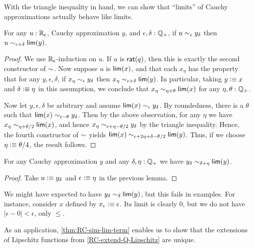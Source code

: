 With the triangle inequality in hand, we can show that ``limits'' of Cauchy approximations actually behave like limits.

\begin{lem}\label{thm:RC-sim-lim}
  For any $u:\mathbb{R}_\mathsf{c}$, Cauchy approximation $y$, and $\epsilon,\delta:\mathbb{Q}_{+}$, if $u\sim_{\epsilon} y_\delta$ then $u\sim_{\epsilon+\delta} \mathsf{lim}(y)$.
\end{lem}
\begin{proof}
  We use $\mathbb{R}_\mathsf{c}$-induction on $u$.
  If $u$ is $\mathsf{rat}(q)$, then this is exactly the second constructor of $\mathord\sim$.
  Now suppose $u$ is $\mathsf{lim}(x)$, and that each $x_\eta$ has the property that for any $y,\epsilon,\delta$, if $x_\eta\sim_{\epsilon} y_\delta$ then $x_\eta \sim_{\epsilon+\delta} \mathsf{lim}(y)$.
  In particular, taking $y\vcentcolon\equiv x$ and $\delta\vcentcolon\equiv\eta$ in this assumption, we conclude that $x_\eta \sim_{\eta+\theta} \mathsf{lim}(x)$ for any $\eta,\theta:\mathbb{Q}_{+}$.

  Now let $y,\epsilon,\delta$ be arbitrary and assume $\mathsf{lim}(x) \sim_{\epsilon} y_\delta$.
  By roundedness, there is a $\theta$ such that $\mathsf{lim}(x) \sim_{\epsilon-\theta} y_\delta$.
  Then by the above observation, for any $\eta$ we have $x_\eta \sim_{\eta+\theta/2} \mathsf{lim}(x)$, and hence $x_\eta \sim_{\epsilon+\eta-\theta/2} y_\delta$ by the triangle inequality.
  Hence, the fourth constructor of $\mathord\sim$ yields $\mathsf{lim}(x) \sim_{\epsilon+2\eta+\delta-\theta/2} \mathsf{lim}(y)$.
  Thus, if we choose $\eta \vcentcolon\equiv \theta/4$, the result follows.
\end{proof}

\begin{lem}\label{thm:RC-sim-lim-term}
  For any Cauchy approximation $y$ and any $\delta,\eta:\mathbb{Q}_{+}$ we have $y_\delta \sim_{\delta+\eta} \mathsf{lim}(y)$.
\end{lem}
\begin{proof}
  Take $u\vcentcolon\equiv y_\delta$ and $\epsilon\vcentcolon\equiv \eta$ in the previous lemma.
\end{proof}

\begin{rmk}
  We might have expected to have $y_\delta \sim_{\delta} \mathsf{lim}(y)$, but this fails in examples.
  For instance, consider $x$ defined by $x_\epsilon \vcentcolon\equiv \epsilon$.
  Its limit is clearly $0$, but we do not have $|\epsilon - 0 |<\epsilon$, only $\le$.
\end{rmk}

As an application, \autoref{thm:RC-sim-lim-term} enables us to show that the extensions of Lipschitz functions from \autoref{RC-extend-Q-Lipschitz} are unique.

